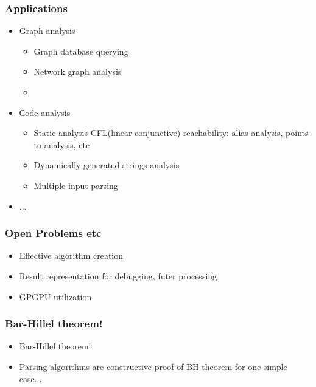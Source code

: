 \documentclass{beamer}
\begin{document}
\begin{frame}[fragile]
  \transwipe[direction=90]
  \frametitle{Applications}
  \begin{itemize}
    \item Graph analysis
    \begin{itemize}
      \item Graph database querying
      \item Network graph analysis
      \item  
    \end{itemize}
    \item Сode analysis
    \begin{itemize}
      \item Static analysis CFL(linear conjunctive) reachability: alias analysis, points-to analysis, etc
      \item Dynamically generated strings analysis
      \item Multiple input parsing 
    \end{itemize}
    \item ...
  \end{itemize}
\end{frame}

\begin{frame}
  \transwipe[direction=90]
  \frametitle{Open Problems etc}
  \begin{itemize}
    \item Effective algorithm creation
    \item Result representation for debugging, futer processing 
    \item GPGPU utilization
  \end{itemize}
\end{frame}

\begin{frame}
  \transwipe[direction=90]
  \frametitle{Bar-Hillel theorem!}
  \begin{itemize}
    \item Bar-Hillel theorem!
    \item Parsing algorithms are constructive proof of BH theorem for one simple case...
  \end{itemize}
\end{frame}
\end{document}
